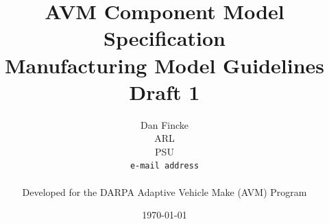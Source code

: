 \documentclass{report}
\begin{document}
\title{AVM Component Model Specification\\Manufacturing Model Guidelines\\Draft 1}
\author{Dan Fincke\\
	ARL\\
	PSU \\
	\texttt{e-mail address}\\
	\\
	Developed for the DARPA Adaptive Vehicle Make (AVM) Program}
\date{\today}


\maketitle

\tableofcontents


\end{document}
